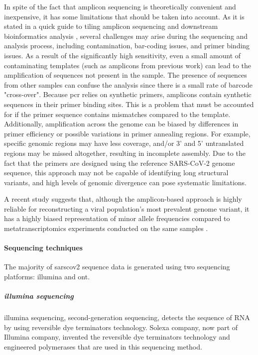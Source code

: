         In spite of the fact that amplicon sequencing is theoretically convenient and inexpensive, it has some limitations that should be taken into account. As it is stated in a quick guide to tiling amplicon sequencing and downstream bioinformatics analysis \cite{grubaugh2019,loman}, several challenges may arise during the sequencing and analysis process, including contamination, bar-coding issues, and primer binding issues. As a result of the significantly high sensitivity, even a small amount of contaminating templates (such as amplicons from previous work) can lead to the amplification of sequences not present in the sample. The presence of sequences from other samples can confuse the analysis since there is a small rate of barcode "cross-over". Because \acrshort{pcr} relies on synthetic primers, amplicons contain synthetic sequences in their primer binding sites. This is a problem that must be accounted for if the primer sequence contains mismatches compared to the template. Additionally, amplification across the genome can be biased by differences in primer efficiency or possible variations in primer annealing regions. For example, specific genomic regions \cite{itokawa2020} may have less coverage, and/or 3' and 5' untranslated regions may be missed altogether, resulting in incomplete assembly. Due to the fact that the primers are designed using the reference SARS-CoV-2 genome sequence, this approach may not be capable of identifying long structural variants, and high levels of genomic divergence can pose systematic limitations.
        
        A recent study suggests that, although the amplicon-based approach is highly reliable for reconstructing a viral population's most prevalent genome variant, it has a highly biased representation of minor allele frequencies compared to metatranscriptomics experiments conducted on the same samples \cite{xia2020}.
        
        \paragraph{Sequencing techniques}
        
        The majority of \acrshort{sarscov2} sequence data is generated using two sequencing platforms: \acrfull{illumina} and \acrfull{ont}. 
        
        \subparagraph{\acrshort{illumina} sequencing}
        
        \acrshort{illumina} sequencing, second-generation sequencing, detects the sequence of RNA by using reversible dye terminators technology. Solexa company, now part of Illumina company, invented the reversible dye terminators technology and engineered polymerases that are used in this sequencing method.
        
